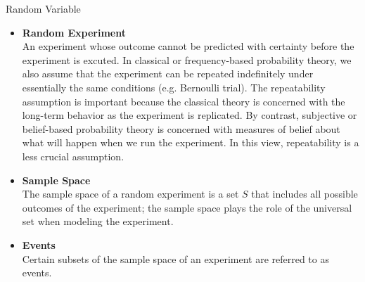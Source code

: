 \documentclass{bredelebeamer}
\begin{document}
\begin{frame}{Random Variable}
  \begin{itemize}
    \item\begin{justify}
      \textbf{Random Experiment}\\
      An experiment whose outcome cannot be predicted with certainty before the
      experiment is excuted. In classical or frequency-based probability theory,
      we also assume that the experiment can be repeated indefinitely under
      essentially the same conditions (e.g. Bernoulli trial). The repeatability
      assumption is important because the classical theory is concerned with the
      long-term behavior as the experiment is replicated. By contrast, subjective
      or belief-based probability theory is concerned with measures of belief
      about what will happen when we run the experiment. In this view, repeatability
      is a less crucial assumption.
    \end{justify}
    \item\begin{justify}
      \textbf{Sample Space}\\
      The sample space of a random experiment is a set $S$ that includes all
      possible outcomes of the experiment; the sample space plays the role of the
      universal set when modeling the experiment.
    \end{justify}
    \item\begin{justify}
      \textbf{Events}\\
      Certain subsets of the sample space of an experiment are referred to as events.
    \end{justify}
  \end{itemize}
\end{frame}
\end{document}
